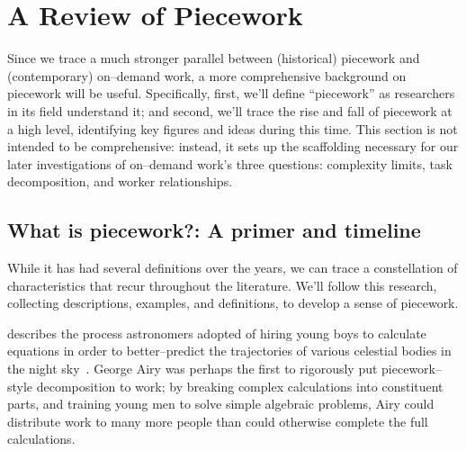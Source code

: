 \documentclass[trackingWork]{subfiles}
\begin{document}
\section{A Review of Piecework}

Since we trace a much stronger parallel between
(historical) piecework and (contemporary) on--demand work,
a more comprehensive background on piecework will be useful.
Specifically,
first, we'll define ``piecework'' as researchers in its field understand it;
and second, we'll trace the rise and fall of piecework at a high level,
identifying key figures and ideas during this time.
This section is not intended to be comprehensive:
instead, it sets up the scaffolding necessary for
our later investigations of on--demand work's three questions:
complexity limits,
task decomposition, and
worker relationships.




\subsection{What is piecework?: A primer and timeline}\label{sec:whatIsPiecework}

While it has had several definitions over the years,
we can trace a constellation of characteristics that recur throughout the literature.
We'll follow this research, collecting
descriptions,
examples, and
definitions,
to develop a sense of piecework.

\citeauthor{grier2013computers} describes the process astronomers adopted of hiring young boys
to calculate equations in order
to better--predict the trajectories of various celestial bodies in the night sky~\cite{grier2013computers}.
George Airy was perhaps the first to rigorously put piecework--style decomposition to work;
by breaking complex calculations into constituent parts, and
training young men to solve simple algebraic problems,
Airy could distribute work to many more people than could otherwise complete the full calculations.
\end{document}
